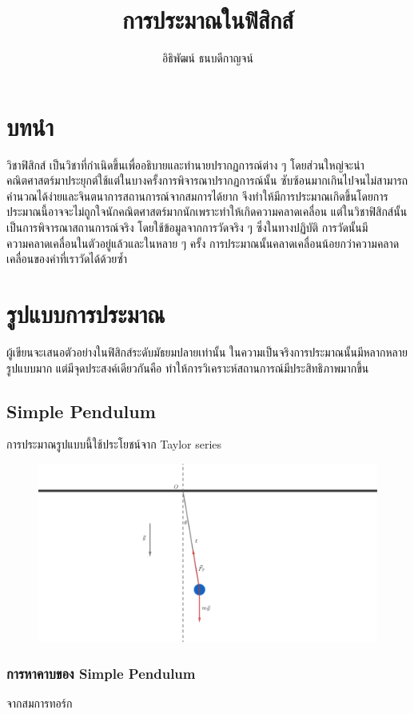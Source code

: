 \documentclass[a4paper,12pt]{article}
\title{การประมาณในฟิสิกส์}
\author{อิธิพัฒน์ ธนบดีกาญจน์}
\begin{document}
\maketitle

\section{บทนำ}

วิชาฟิสิกส์ เป็นวิชาที่กำเนิดขึ้นเพื่ออธิบายและทำนายปรากฏการณ์ต่าง ๆ โดยส่วนใหญ่จะนำคณิตศาสตร์มาประยุกต์ใช้แต่ในบางครั้งการพิจารณาปรากฏการณ์นั้น ซับซ้อนมากเกินไปจนไม่สามารถคำนวณได้ง่ายและจินตนาการสถานการณ์จากสมการได้ยาก จึงทำให้มีการประมาณเกิดขึ้นโดยการประมาณนี้อาจจะไม่ถูกใจนักคณิตศาสตร์มากนักเพราะทำให้เกิดความคลาดเคลื่อน แต่ในวิชาฟิสิกส์นั้นเป็นการพิจารณาสถานการณ์จริง โดยใช้ข้อมูลจากการวัดจริง ๆ ซึ่งในทางปฏิบัติ การวัดนั้นมีความคลาดเคลื่อนในตัวอยู่แล้วและในหลาย ๆ ครั้ง การประมาณนั้นคลาดเคลื่อนน้อยกว่าความคลาดเคลื่อนของค่าที่เราวัดได้ด้วยซ้ำ

\section{รูปแบบการประมาณ}
ผู้เขียนจะเสนอตัวอย่างในฟิสิกส์ระดับมัธยมปลายเท่านั้น ในความเป็นจริงการประมาณนั้นมีหลากหลายรูปแบบมาก แต่มีจุดประสงค์เดียวกันคือ ทำให้การวิเคราะห์สถานการณ์มีประสิทธิภาพมากขึ้น
	\subsection{Simple Pendulum}
	การประมาณรูปแบบนี้ใช้ประโยชน์จาก Taylor series
	\begin{figure}[h]
		\centering
		\includegraphics[width=0.3\linewidth]{pendulum}	
		\label{fig:pen1}
	\end{figure}
\pagebreak
	\subsubsection{การหาคาบของ Simple Pendulum}
	จากสมการทอร์ก
	
\end{document}
